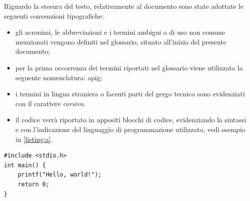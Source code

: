 Riguardo la stesura del testo, relativamente al documento sono state adottate le seguenti convenzioni tipografiche:
\begin{itemize}
	\item gli acronimi, le abbreviazioni e i termini ambigui o di uso non comune menzionati vengono definiti nel glossario, situato all'inizio del presente documento;
	\item per la prima occorrenza dei termini riportati nel glossario viene utilizzata la seguente nomenclatura: \gls{apig};
	\item i termini in lingua straniera o facenti parti del gergo tecnico sono evidenziati con il carattere \textit{corsivo}.
	\item il codice verrà riportato in appositi blocchi di codice, evidenziando la sintassi e con l'indicazione del linguaggio di programmazione utilizzato, vedi esempio in \autoref{listing:a}.
\end{itemize}

\begin{listing}[H]
\begin{verbatim}
#include <stdio.h>
int main() {
    printf("Hello, world!");
    return 0;
}
\end{verbatim}
\caption{Esempio di blocco di codice}
\label{listing:a}
\end{listing}

\newpage